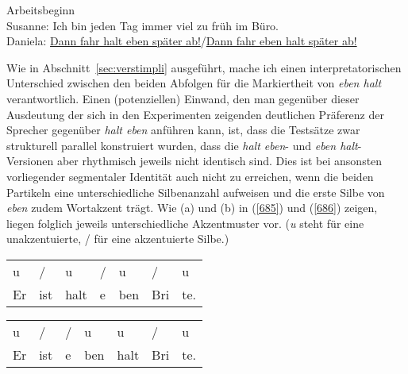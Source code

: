 \begin{exe}
	\ex\label{684} Arbeitsbeginn\\
	Susanne: Ich bin jeden Tag immer viel zu früh im Büro.\\
	Daniela: \ul{Dann fahr halt eben später ab!}/\ul{Dann fahr eben halt später ab!}
\end{exe}
Wie in Abschnitt~\ref{sec:verstimpli} ausgeführt, mache ich einen interpretatorischen Unterschied zwischen den beiden Abfolgen für die Markiertheit von \textit{eben halt} verantwortlich. Einen (potenziellen) Einwand, den man gegenüber dieser Ausdeutung der sich in den Experimenten zeigenden deutlichen Präferenz der Sprecher gegenüber \textit{halt eben} anführen kann, ist, dass die Testsätze zwar strukturell pa\-rallel konstruiert wurden, dass die \textit{halt eben}- und \textit{eben halt}-Versionen aber rhythmisch jeweils nicht identisch sind. Dies ist bei ansonsten vorliegender segmentaler Identität auch nicht zu erreichen, wenn die beiden Partikeln eine unterschiedliche Sil\-benanzahl aufweisen und die erste Silbe von \textit{eben} zudem Wortakzent  trägt. Wie (a) und (b) in (\ref{685}) und (\ref{686}) zeigen, liegen folglich jeweils unterschiedliche Akzentmuster vor. (\textit{u} steht für eine unakzentuierte, / für eine akzentuierte Silbe.)

\begin{exe}
	\ex\label{685} 
	\begin{xlist} 
	\ex\label{685a}
	\begin{tabular}[t]{lllllll}
	u & / & u & / & u & / & u\\
	Er & ist & halt & e & ben & Bri & te.
    \end{tabular}
    \ex\label{685b}
	\begin{tabular}[t]{lllllll}
	u & / & / & u & u & / & u\\
	Er & ist & e & ben & halt & Bri & te.
    \end{tabular}
\end{xlist}    
\end{exe}

